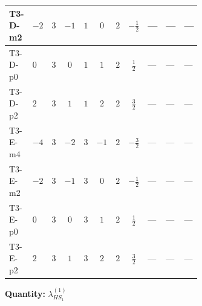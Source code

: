 \documentclass[8pt]{article}
\begin{document}
\begin{landscape}
\begin{longtable}{@{}llcccccc >{\raggedright\arraybackslash}p{0.21\linewidth} >{\raggedright\arraybackslash}p{0.21\linewidth} >{\raggedright\arraybackslash}p{0.21\linewidth}@{}}
\midrule
T3-D-m2 & $-2$ & $3$ & $-1$ & $1$ & $0$ & $2$ & $-\frac{1}{2}$ & --- & --- & --- \\
\midrule
T3-D-p0 & $0$ & $3$ & $0$ & $1$ & $1$ & $2$ & $\frac{1}{2}$ & --- & --- & --- \\
\midrule
T3-D-p2 & $2$ & $3$ & $1$ & $1$ & $2$ & $2$ & $\frac{3}{2}$ & --- & --- & --- \\
\midrule
T3-E-m4 & $-4$ & $3$ & $-2$ & $3$ & $-1$ & $2$ & $-\frac{3}{2}$ & --- & --- & --- \\
\midrule
T3-E-m2 & $-2$ & $3$ & $-1$ & $3$ & $0$ & $2$ & $-\frac{1}{2}$ & --- & --- & --- \\
\midrule
T3-E-p0 & $0$ & $3$ & $0$ & $3$ & $1$ & $2$ & $\frac{1}{2}$ & --- & --- & --- \\
\midrule
T3-E-p2 & $2$ & $3$ & $1$ & $3$ & $2$ & $2$ & $\frac{3}{2}$ & --- & --- & --- \\
\midrule
\bottomrule
\end{longtable}
\clearpage
\noindent\textbf{Quantity: }$\lambda_{HS_1}^{(1)}$\par\smallskip

\end{landscape}
\end{document}
